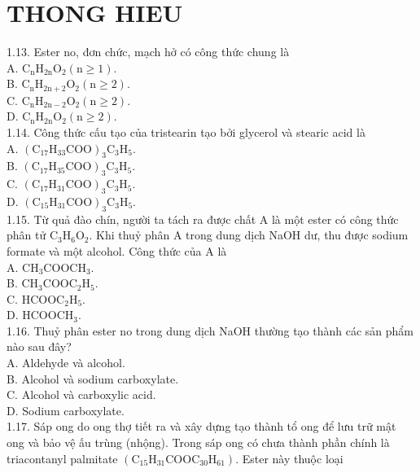 \documentclass[10pt]{article}
\begin{document}
\section*{THONG HIEU}
1.13. Ester no, đơn chức, mạch hở có công thức chung là\\
A. $\mathrm{C}_{\mathrm{n}} \mathrm{H}_{2 \mathrm{n}} \mathrm{O}_{2}(\mathrm{n} \geq 1)$.\\
B. $\mathrm{C}_{\mathrm{n}} \mathrm{H}_{2 \mathrm{n}+2} \mathrm{O}_{2}(\mathrm{n} \geq 2)$.\\
C. $\mathrm{C}_{\mathrm{n}} \mathrm{H}_{2 \mathrm{n}-2} \mathrm{O}_{2}(\mathrm{n} \geq 2)$.\\
D. $\mathrm{C}_{\mathrm{n}} \mathrm{H}_{2 \mathrm{n}} \mathrm{O}_{2}(\mathrm{n} \geq 2)$.\\
1.14. Công thức cấu tạo của tristearin tạo bởi glycerol và stearic acid là\\
A. $\left(\mathrm{C}_{17} \mathrm{H}_{33} \mathrm{COO}\right)_{3} \mathrm{C}_{3} \mathrm{H}_{5}$.\\
B. $\left(\mathrm{C}_{17} \mathrm{H}_{35} \mathrm{COO}\right)_{3} \mathrm{C}_{3} \mathrm{H}_{5}$.\\
C. $\left(\mathrm{C}_{17} \mathrm{H}_{31} \mathrm{COO}\right)_{3} \mathrm{C}_{3} \mathrm{H}_{5}$.\\
D. $\left(\mathrm{C}_{15} \mathrm{H}_{31} \mathrm{COO}\right)_{3} \mathrm{C}_{3} \mathrm{H}_{5}$.\\
1.15. Từ quả đào chín, người ta tách ra được chất A là một ester có công thức phân tử $\mathrm{C}_{3} \mathrm{H}_{6} \mathrm{O}_{2}$. Khi thuỷ phân A trong dung dịch NaOH dư, thu được sodium formate và một alcohol. Công thức của A là\\
A. $\mathrm{CH}_{3} \mathrm{COOCH}_{3}$.\\
B. $\mathrm{CH}_{3} \mathrm{COOC}_{2} \mathrm{H}_{5}$.\\
C. $\mathrm{HCOOC}_{2} \mathrm{H}_{5}$.\\
D. $\mathrm{HCOOCH}_{3}$.\\
1.16. Thuỷ phân ester no trong dung dịch NaOH thường tạo thành các sản phẩm nào sau đây?\\
A. Aldehyde và alcohol.\\
B. Alcohol và sodium carboxylate.\\
C. Alcohol và carboxylic acid.\\
D. Sodium carboxylate.\\
1.17. Sáp ong do ong thợ tiết ra và xây dựng tạo thành tổ ong để lưu trữ mật ong và bảo vệ ấu trùng (nhộng). Trong sáp ong có chưa thành phần chính là triacontanyl palmitate $\left(\mathrm{C}_{15} \mathrm{H}_{31} \mathrm{COOC}_{30} \mathrm{H}_{61}\right)$. Ester này thuộc loại\\
\end{document}
